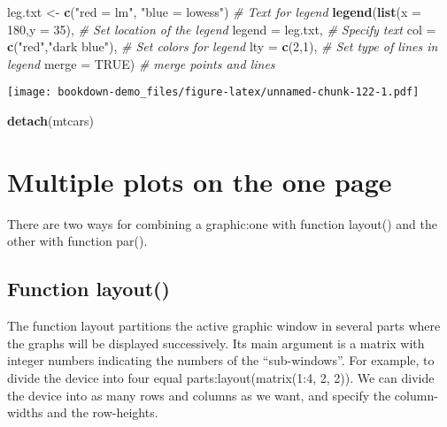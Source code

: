 \documentclass[]{book}
\newenvironment{Shaded}{\begin{snugshade}}{\end{snugshade}}
\newcommand{\KeywordTok}[1]{\textcolor[rgb]{0.13,0.29,0.53}{\textbf{#1}}}
\newcommand{\DataTypeTok}[1]{\textcolor[rgb]{0.13,0.29,0.53}{#1}}
\newcommand{\DecValTok}[1]{\textcolor[rgb]{0.00,0.00,0.81}{#1}}
\newcommand{\StringTok}[1]{\textcolor[rgb]{0.31,0.60,0.02}{#1}}
\newcommand{\CommentTok}[1]{\textcolor[rgb]{0.56,0.35,0.01}{\textit{#1}}}
\newcommand{\OtherTok}[1]{\textcolor[rgb]{0.56,0.35,0.01}{#1}}
\newcommand{\NormalTok}[1]{#1}
\theoremstyle{definition}
\theoremstyle{definition}
\theoremstyle{definition}
\theoremstyle{remark}
\begin{document}
\begin{Shaded}
\begin{Highlighting}[]
\NormalTok{leg.txt <-}\StringTok{ }\KeywordTok{c}\NormalTok{(}\StringTok{"red = lm"}\NormalTok{, }\StringTok{"blue = lowess"}\NormalTok{) }\CommentTok{# Text for legend}
\KeywordTok{legend}\NormalTok{(}\KeywordTok{list}\NormalTok{(}\DataTypeTok{x =} \DecValTok{180}\NormalTok{,}\DataTypeTok{y =} \DecValTok{35}\NormalTok{),           }\CommentTok{# Set location of the legend}
       \DataTypeTok{legend =}\NormalTok{ leg.txt,               }\CommentTok{# Specify text }
       \DataTypeTok{col =} \KeywordTok{c}\NormalTok{(}\StringTok{"red"}\NormalTok{,}\StringTok{"dark blue"}\NormalTok{),     }\CommentTok{# Set colors for legend}
       \DataTypeTok{lty =} \KeywordTok{c}\NormalTok{(}\DecValTok{2}\NormalTok{,}\DecValTok{1}\NormalTok{),                   }\CommentTok{# Set type of lines in legend}
       \DataTypeTok{merge =} \OtherTok{TRUE}\NormalTok{)                   }\CommentTok{# merge points and lines}
\end{Highlighting}
\end{Shaded}

\texttt{[image: bookdown-demo\_files/figure-latex/unnamed-chunk-122-1.pdf]}

\begin{Shaded}
\begin{Highlighting}[]
\KeywordTok{detach}\NormalTok{(mtcars)}
\end{Highlighting}
\end{Shaded}

\section{Multiple plots on the one
page}\label{multiple-plots-on-the-one-page}

There are two ways for combining a graphic:one with function layout()
and the other with function par().

\subsection{Function layout()}\label{function-layout}

The function layout partitions the active graphic window in several
parts where the graphs will be displayed successively. Its main argument
is a matrix with integer numbers indicating the numbers of the
``sub-windows''. For example, to divide the device into four equal
parts:layout(matrix(1:4, 2, 2)). We can divide the device into as many
rows and columns as we want, and specify the column-widths and the
row-heights.
\end{document}
